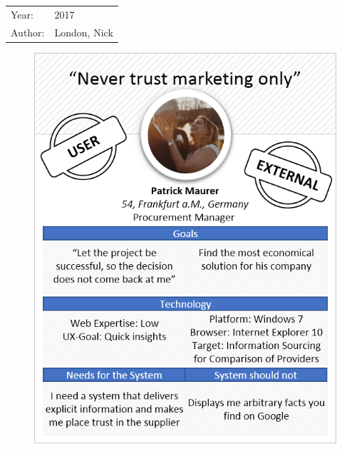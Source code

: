 \begin{tabular}{l l}
Year: & 2017 \\
Author: & London, Nick \\
\end{tabular}

\begin{figure}[H] 
        \centering\includegraphics[width=\textwidth]{img/diagrams/personas/customer1.png}
	\captionsetup{labelformat=empty}
        \caption[]{}
\end{figure}
